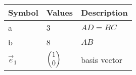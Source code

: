 \begin{tabular}{|p{3cm}|p{3cm}|p{3cm}|}
\hline                                        
	\textbf{Symbol} & \textbf{Values} & \textbf{Description} \\                                          
\hline                                 
	a & 3 & $AD=BC$ \\        
\hline                                    
	b & 8 & $AB$ \\    
\hline                      
	$\vec{e}_1$ & $\begin{pmatrix}1\\0\end{pmatrix}$ & basis vector \\
\hline
\end{tabular}
